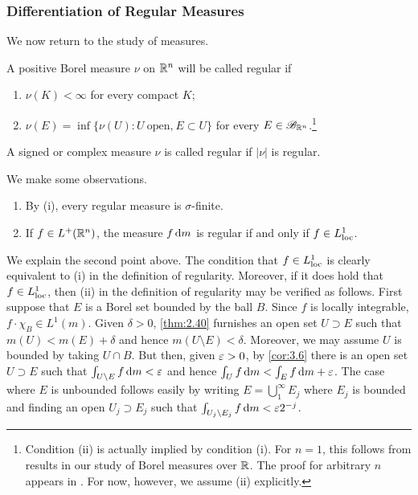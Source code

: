 \documentclass[12pt]{article} %
\begin{document}
\subsubsection{Differentiation of Regular Measures}

We now return to the study of measures.

\begin{definition}
    A positive Borel measure $\nu$ on $\mathbb{R}^n$ will be called regular if \begin{enumerate}
        \item $\nu(K) < \infty$ for every compact $K$;
        \item $\nu(E) = \inf\{\nu(U) : U \ \text{open,} \ E \subset U\}$ for every $E \in \mathscr{B}_{\mathbb{R}^n}$.\footnote{Condition (ii) is actually implied by condition (i). For $n = 1$, this follows from results in our study of Borel measures over $\mathbb{R}$. The proof for arbitrary $n$ appears in \citet[Chapter~7]{folland1999real}. For now, however, we assume (ii) explicitly.}
    \end{enumerate}
    A signed or complex measure $\nu$ is called regular if $|\nu|$ is regular.
\end{definition}

\begin{remark}
    We make some observations. \begin{enumerate}
        \item By (i), every regular measure is $\sigma$-finite.
        \item If $f \in L^+(\mathbb{R}^n)$, the measure $f \, \mathrm{d} m$ is regular if and only if $f \in L_{\operatorname{loc}}^1$.
    \end{enumerate}
\end{remark}

\noindent We explain the second point above. The condition that $f \in L_{\operatorname{loc}}^1$ is clearly equivalent to (i) in the definition of regularity. Moreover, if it does hold that $f \in L_{\operatorname{loc}}^1$, then (ii) in the definition of regularity may be verified as follows. First suppose that $E$ is a Borel set bounded by the ball $B$. Since $f$ is locally integrable, $f \cdot \chi_B \in L^1(m)$. Given $\delta > 0$, \cref{thm:2.40} furnishes an open set $U \supset E$ such that $m(U) < m(E) + \delta$ and hence $m(U \setminus E) < \delta$. Moreover, we may assume $U$ is bounded by taking $U \cap B$. But then, given $\varepsilon > 0$, by \cref{cor:3.6} there is an open set $U \supset E$ such that $\int_{U \setminus E} f \, \mathrm{d} m < \varepsilon$ and hence $\int_U f \, \mathrm{d} m < \int_E f \, \mathrm{d} m + \varepsilon$. The case where $E$ is unbounded follows easily by writing $E = \bigcup_1^\infty E_j$ where $E_j$ is bounded and finding an open $U_j \supset E_j$ such that $\int_{U_j \setminus E_j} f \, \mathrm{d} m < \varepsilon 2^{-j}$.
\end{document}

